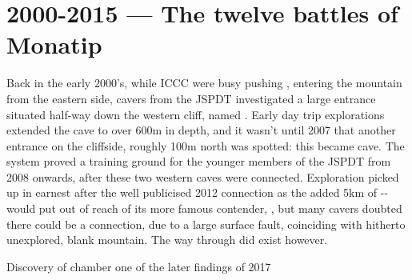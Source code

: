 \section{2000-2015 --- The twelve battles of Monatip}
\label{sec:early primadona}
Back in the early 2000's, while ICCC were busy pushing , entering the mountain from the eastern side, cavers from the JSPDT investigated a large entrance situated half-way down the western cliff, named . Early day trip explorations extended the cave to over 600m in depth, and it wasn't until 2007 that another entrance  on the cliffside, roughly 100m north was spotted: this became  cave. The system proved a training ground for the younger members of the JSPDT from 2008 onwards, after these two western caves were connected. Exploration picked up in earnest after the well publicised 2012 connection as the added 5km of -- would put  out of reach of its more famous contender, , but many cavers doubted there could be a connection, due to a large surface fault, coinciding with hitherto unexplored, blank mountain. The way through did exist however.


	\begin{marginfigure}
	\checkoddpage \ifoddpage \forcerectofloat \else \forceversofloat \fi
	\centering
  	\caption{Discovery of \protect{} chamber one of the later findings of 2017 }
	\end{marginfigure}
	

